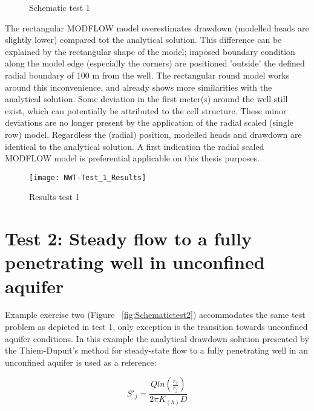 \begin{figure}[h]
\centering
{}
\captionsetup{justification=centering}
\caption{Schematic test 1}
\label{fig:Schematictest1}
\end{figure}

The rectangular MODFLOW model overestimates drawdown (modelled heads are slightly lower) compared tot the analytical solution. This difference can be explained by the rectangular shape of the model; imposed boundary condition along the model edge (especially the corners) are positioned 'outside' the defined radial boundary of 100 m from the well. The rectangular round model works around this inconvenience, and already shows more similarities with the analytical solution. Some deviation in the first meter(s) around the well still exist, which can potentially be attributed to the cell structure. These minor deviations are no longer present by the application of the radial scaled (single row) model. Regardless the (radial) position, modelled heads and drawdown are identical to the analytical solution. A first indication the radial scaled MODFLOW model is preferential applicable on this thesis purposes.  

\begin{figure}[h!]
 \centering\texttt{[image: NWT-Test\_1\_Results]}
 \captionsetup{justification=centering}
 \caption{Results test 1}
 \label{fig:Test1_results}
\end{figure} 


\clearpage\section{Test 2: Steady flow to a fully penetrating well in unconfined aquifer}
Example exercise two (Figure ~\ref{fig:Schematictest2}) accommodates the same test problem as depicted in test 1, only exception is the transition towards unconfined aquifer conditions. In this example the analytical drawdown solution presented by the Thiem-Dupuit's method for steady-state flow to a fully penetrating well in an unconfined aquifer is used as a reference\citep{Kruseman2000}:

\begin{equation}
 S'_j = \frac{Q ln(\frac{r_{2}}{r_{j}})}{2\pi K_{(h)}D}
 \label{eq:thiem_unconfined}
 \end{equation} 
 
